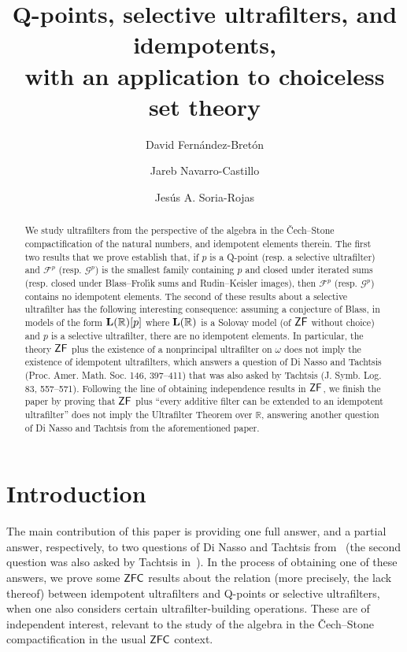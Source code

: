 \documentclass[10pt]{amsart}
\author[D. Fern\'andez]{David Fern\'andez-Bret\'on}
\author[J. Navarro]{Jareb Navarro-Castillo}
\author[J. Soria]{Jes\'us A. Soria-Rojas}
\title[Q-points, selectives, and idempotents]{Q-points, selective ultrafilters, and idempotents, \\ with an application to choiceless set theory}
\newcommand{\lr}{\mathnormal{\mathbf{L}(\mathbb R)}}
\newcommand{\zf}{\mathnormal{\mathsf{ZF}}}
\newcommand{\zfc}{\mathnormal{\mathsf{ZFC}}}
\theoremstyle{definition}
\theoremstyle{remark}
\begin{document}
\maketitle

\begin{abstract}
We study ultrafilters from the perspective of the algebra in the \v{C}ech--Stone compactification of the natural numbers, and idempotent elements therein. The first two results that we prove establish that, if $p$ is a Q-point (resp. a selective ultrafilter) and $\mathscr F^p$ (resp. $\mathscr G^p$) is the smallest family containing $p$ and closed under iterated sums (resp. closed under Blass--Frol\'{\i}k sums and Rudin--Keisler images), then $\mathscr F^p$ (resp. $\mathscr G^p$) contains no idempotent elements. The second of these results about a selective ultrafilter has the following interesting consequence: assuming a conjecture of Blass, in models of the form $\lr[p]$ where $\lr$ is a Solovay model (of $\zf$ without choice) and $p$ is a selective ultrafilter, there are no idempotent elements. In particular, the theory $\zf$ plus the existence of a nonprincipal ultrafilter on $\omega$ does not imply the existence of idempotent ultrafilters, which answers a question of Di Nasso and Tachtsis (Proc. Amer. Math. Soc. 146, 397--411) that was also asked by Tachtsis (J. Symb. Log. 83, 557--571). Following the line of obtaining independence results in $\zf$, we finish the paper by proving that $\zf$ plus ``every additive filter can be extended to an idempotent ultrafilter'' does not imply the Ultrafilter Theorem over $\mathbb R$, answering another question of Di Nasso and Tachtsis from the aforementioned paper.
\end{abstract}

\section{Introduction}

The main contribution of this paper is providing one full answer, and a partial answer, respectively, to two questions of Di Nasso and Tachtsis from~\cite{dinasso-tachtsis} (the second question was also asked by Tachtsis in~\cite{tachtsis-ellis}). In the process of obtaining one of these answers, we prove some $\zfc$ results about the relation (more precisely, the lack thereof) between idempotent ultrafilters and Q-points or selective ultrafilters, when one also considers certain ultrafilter-building operations. These are of independent interest, relevant to the study of the algebra in the \v{C}ech--Stone compactification in the usual $\zfc$ context.
\end{document}
